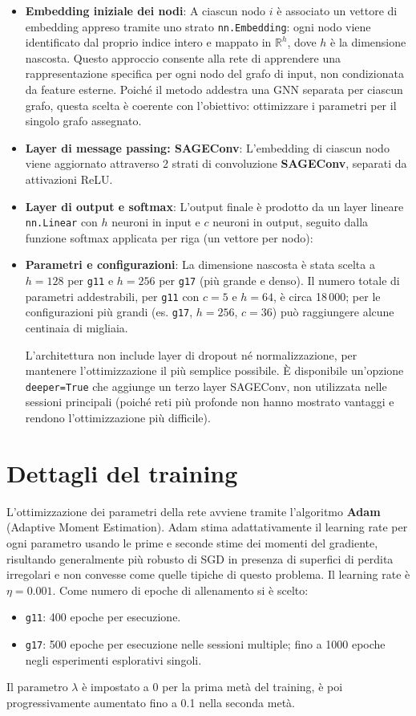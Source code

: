 \documentclass{article}
\begin{document}
\begin{itemize}
\item [-] \textbf{Embedding iniziale dei nodi}: A ciascun nodo $i$ è associato un vettore di embedding appreso tramite uno strato
\texttt{nn.Embedding}: ogni nodo viene identificato dal proprio indice intero e mappato in
$\mathbb{R}^h$, dove $h$ è la dimensione nascosta. Questo approccio consente alla rete di
apprendere una rappresentazione specifica per ogni nodo del grafo di input, non condizionata
da feature esterne. Poiché il metodo addestra una GNN separata per ciascun grafo, questa
scelta è coerente con l'obiettivo: ottimizzare i parametri per il singolo grafo assegnato.
\item [-] \textbf{Layer di message passing: SAGEConv}: L'embedding di ciascun nodo viene aggiornato attraverso 2 strati di convoluzione \textbf{SAGEConv}, separati da attivazioni
ReLU. 
\item [-] \textbf{Layer di output e softmax}: L'output finale è prodotto da un layer lineare \texttt{nn.Linear} con $h$ neuroni in input
e $c$ neuroni in output, seguito dalla funzione softmax applicata per riga (un vettore per
nodo):
\item [-] \textbf{Parametri e configurazioni}: La dimensione nascosta è stata scelta a $h = 128$ per \texttt{g11} e $h = 256$ per
\texttt{g17} (più grande e denso). Il numero totale di parametri addestrabili, per
\texttt{g11} con $c = 5$ e $h = 64$, è circa 18\,000; per le configurazioni più grandi
(es. \texttt{g17}, $h = 256$, $c = 36$) può raggiungere alcune centinaia di migliaia.

L'architettura non include layer di dropout né normalizzazione, per mantenere
l'ottimizzazione il più semplice possibile. È disponibile un'opzione \texttt{deeper=True}
che aggiunge un terzo layer SAGEConv, non utilizzata nelle sessioni principali (poiché reti
più profonde non hanno mostrato vantaggi e rendono l'ottimizzazione più difficile).
\end{itemize}

\section{Dettagli del training}
L'ottimizzazione dei parametri della rete avviene tramite l'algoritmo \textbf{Adam}
(Adaptive Moment Estimation). Adam stima adattativamente il learning rate per ogni
parametro usando le prime e seconde stime dei momenti del gradiente, risultando
generalmente più robusto di SGD in presenza di superfici di perdita irregolari e non
convesse come quelle tipiche di questo problema. Il learning rate è $\eta = 0.001$.
Come numero di epoche di allenamento si è scelto:
\begin{itemize}
    \item \texttt{g11}: 400 epoche per esecuzione.
    \item \texttt{g17}: 500 epoche per esecuzione nelle sessioni multiple; fino a 1000
    epoche negli esperimenti esplorativi singoli.
\end{itemize}
Il parametro $\lambda$ è impostato a $0$ per la prima metà del training, è poi progressivamente aumentato fino a 0.1 nella seconda metà.
\end{document}
